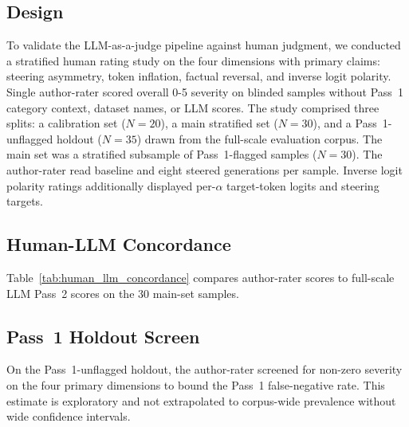 
\subsection{Design}
To validate the LLM-as-a-judge pipeline against human judgment, we conducted a stratified human rating study on the four dimensions with primary claims: steering asymmetry, token inflation, factual reversal, and inverse logit polarity.
Single author-rater scored overall 0-5 severity on blinded samples without Pass~1 category context, dataset names, or LLM scores.
The study comprised three splits: a calibration set ($N{=}20$), a main stratified set ($N{=}30$), and a Pass~1-unflagged holdout ($N{=}35$) drawn from the full-scale evaluation corpus.
The main set was a stratified subsample of Pass~1-flagged samples ($N{=}30$).
The author-rater read baseline and eight steered generations per sample.
Inverse logit polarity ratings additionally displayed per-$\alpha$ target-token logits and steering targets.

\subsection{Human-LLM Concordance}
Table~\ref{tab:human_llm_concordance} compares author-rater scores to full-scale LLM Pass~2 scores on the 30 main-set samples.



\subsection{Pass~1 Holdout Screen}
On the Pass~1-unflagged holdout, the author-rater screened for non-zero severity on the four primary dimensions to bound the Pass~1 false-negative rate.
This estimate is exploratory and not extrapolated to corpus-wide prevalence without wide confidence intervals.

